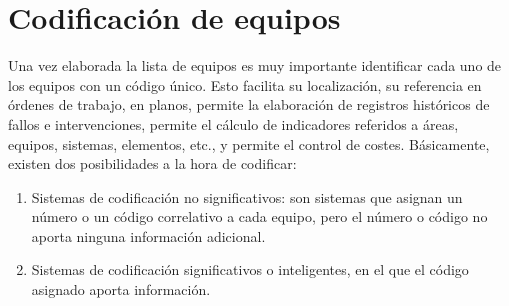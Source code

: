 \documentclass[../main]{subfiles}
\begin{document}
\section{Codificación de equipos}

Una vez elaborada la lista de equipos es muy importante identificar cada
uno de los equipos con un código único. Esto facilita su localización, su referencia en órdenes de trabajo, en planos, permite la elaboración de registros históricos de fallos e intervenciones, permite el cálculo de indicadores referidos
a áreas, equipos, sistemas, elementos, etc., y permite el control de costes.
Básicamente, existen dos posibilidades a la hora de codificar:
\begin{enumerate}
\item Sistemas de codificación no significativos: son sistemas que asignan un número o un código correlativo a cada equipo, pero el número o código no aporta ninguna información adicional.
    \item  Sistemas de codificación significativos o inteligentes, en el que el código asignado aporta información.
\end{enumerate}
\end{document}
